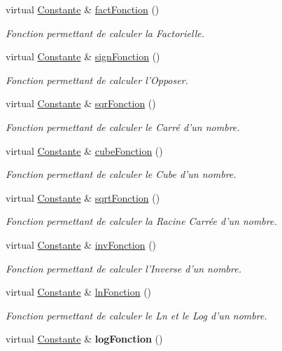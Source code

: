 \begin{DoxyCompactItemize}
\item 
virtual \hyperlink{class_constante}{Constante} \& \hyperlink{class_constante_a52dd5fcfeb66534183e9419c222c6960}{fact\-Fonction} ()
\begin{DoxyCompactList}\small\item\em Fonction permettant de calculer la Factorielle. \end{DoxyCompactList}\item 
virtual \hyperlink{class_constante}{Constante} \& \hyperlink{class_constante_abf6fa0c8026ebcbf5c1a0d55b56f5d5b}{sign\-Fonction} ()
\begin{DoxyCompactList}\small\item\em Fonction permettant de calculer l'Opposer. \end{DoxyCompactList}\item 
virtual \hyperlink{class_constante}{Constante} \& \hyperlink{class_constante_a89475969e57f022a38cc3fb6617e3e29}{sqr\-Fonction} ()
\begin{DoxyCompactList}\small\item\em Fonction permettant de calculer le Carré d'un nombre. \end{DoxyCompactList}\item 
virtual \hyperlink{class_constante}{Constante} \& \hyperlink{class_constante_a19851e590e8c40a4f3fddd3e78780a05}{cube\-Fonction} ()
\begin{DoxyCompactList}\small\item\em Fonction permettant de calculer le Cube d'un nombre. \end{DoxyCompactList}\item 
virtual \hyperlink{class_constante}{Constante} \& \hyperlink{class_constante_a94668c82b50be66607e701d989d5f725}{sqrt\-Fonction} ()
\begin{DoxyCompactList}\small\item\em Fonction permettant de calculer la Racine Carrée d'un nombre. \end{DoxyCompactList}\item 
virtual \hyperlink{class_constante}{Constante} \& \hyperlink{class_constante_aa6b78608f1cac4f73fd6fc329827fc51}{inv\-Fonction} ()
\begin{DoxyCompactList}\small\item\em Fonction permettant de calculer l'Inverse d'un nombre. \end{DoxyCompactList}\item 
virtual \hyperlink{class_constante}{Constante} \& \hyperlink{class_constante_ae5ab8d028c8f1f30adecd55e490abc02}{ln\-Fonction} ()
\begin{DoxyCompactList}\small\item\em Fonction permettant de calculer le Ln et le Log d'un nombre. \end{DoxyCompactList}\item 
\hypertarget{class_constante_a59acb8fb371ba3ac53670ec6a62d1864}{virtual \hyperlink{class_constante}{Constante} \& {\bfseries log\-Fonction} ()}\label{class_constante_a59acb8fb371ba3ac53670ec6a62d1864}

\end{DoxyCompactItemize}


